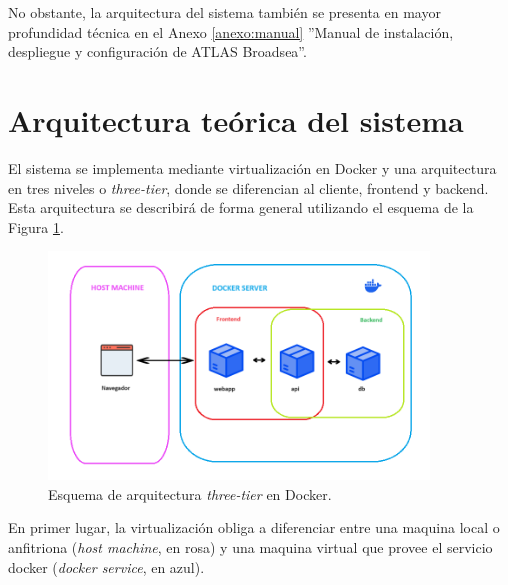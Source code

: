 No obstante, la arquitectura del sistema también se presenta en mayor profundidad técnica en el Anexo \ref{anexo:manual} ''Manual de instalación, despliegue y configuración de ATLAS Broadsea''.

\section{Arquitectura teórica del sistema} \label{sec:08teorica}

El sistema se implementa mediante virtualización en Docker y una arquitectura en tres niveles o \textit{three-tier}, donde se diferencian al cliente, frontend y backend. Esta arquitectura se describirá de forma general utilizando el esquema de la Figura \ref{fig:threeTierValle}.

\begin{figure}[H]
    \centering
    \includegraphics[width=0.90\textwidth]{figures/threeTierValle.png}
    \caption{Esquema de arquitectura \textit{three-tier} en Docker.}
    \label{fig:threeTierValle}
\end{figure}

En primer lugar, la virtualización obliga a diferenciar entre una maquina local o anfitriona (\textit{host machine}, en rosa) y una maquina virtual que provee el servicio docker (\textit{docker service}, en azul). 

